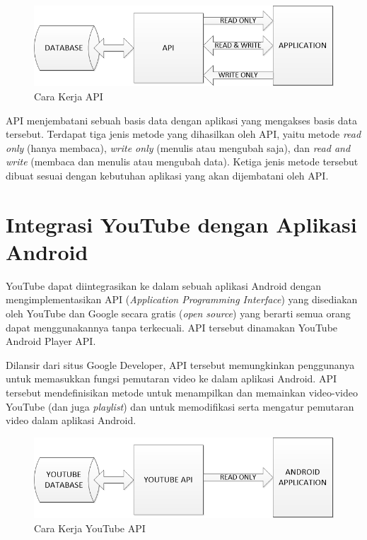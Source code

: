 	\begin{figure}[H]
		\centering
		\includegraphics[width=1\textwidth]{gambar/api/api_chart}
		\caption{Cara Kerja API}
	\end{figure}

	API menjembatani sebuah basis data dengan aplikasi yang mengakses basis data tersebut. Terdapat tiga jenis metode yang dihasilkan oleh API, yaitu metode \textit{read only} (hanya membaca), \textit{write only} (menulis atau mengubah saja), dan \textit{read and write} (membaca dan menulis atau mengubah data). Ketiga jenis metode tersebut dibuat sesuai dengan kebutuhan aplikasi yang akan dijembatani oleh API.   
	 
	
\section{Integrasi YouTube dengan Aplikasi Android}
	YouTube dapat diintegrasikan ke dalam sebuah aplikasi Android dengan mengimplementasikan API (\emph{Application Programming Interface}) yang disediakan oleh YouTube dan Google secara gratis (\emph{open source}) yang berarti semua orang dapat menggunakannya tanpa terkecuali. API tersebut dinamakan YouTube Android Player API.
	
	Dilansir dari situs Google Developer, API tersebut memungkinkan penggunanya untuk memasukkan fungsi pemutaran video ke dalam aplikasi Android. API tersebut mendefinisikan metode untuk menampilkan dan memainkan video-video YouTube (dan juga \emph{playlist}) dan untuk memodifikasi serta mengatur pemutaran video dalam aplikasi Android.
	
	\begin{figure}[H]
		\centering
		\includegraphics[width=1\textwidth]{gambar/api/youtube_api_chart}
		\caption{Cara Kerja YouTube API}
	\end{figure}

